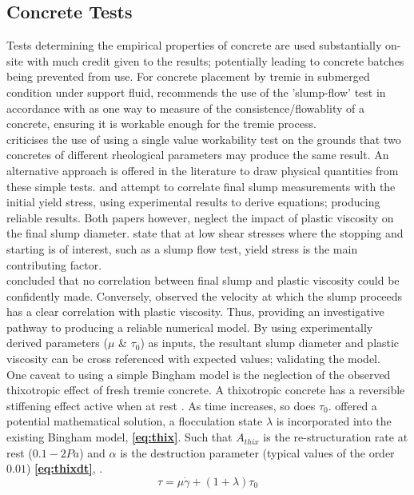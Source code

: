 \subsection{Concrete Tests}
Tests determining the empirical properties of concrete are used substantially on-site with much credit given to the results; potentially leading to concrete batches being prevented from use. For concrete placement by tremie in submerged condition under support fluid, \citet{Sperwall} recommends the use of the 'slump-flow' test in accordance with \citeauthor{BS123508} as one way to measure of the consistence/flowablity of a concrete, ensuring it is workable enough for the tremie process.\\
\newline
\noindent
\citet{wallevik06} criticises the use of using a single value workability test on the grounds that two concretes of different rheological parameters may produce the same result. An alternative approach is offered in the literature to draw physical quantities from these simple tests. \citet{roussel50} and \citet{wallevik06} attempt to correlate final slump measurements with the initial yield stress, using experimental results to derive equations; producing reliable results. Both papers however, neglect the impact of plastic viscosity on the final slump diameter. \citet{sofcf} state that at low shear stresses where the stopping and starting is of interest, such as a slump flow test, yield stress is the main contributing factor.\\
\newline
\noindent
\citet{wallevik06} concluded that no correlation between final slump and plastic viscosity could be confidently made. Conversely, \citet{TUM} observed the velocity at which the slump proceeds has a clear correlation with plastic viscosity. Thus, providing an investigative pathway to producing a reliable numerical model. By using experimentally derived parameters ($\mu$ \& $\tau_0$) as inputs, the resultant slump diameter and plastic viscosity can be cross referenced with expected values; validating the model.\\
\newline
One caveat to using a simple Bingham model is the neglection of the observed thixotropic effect of fresh tremie concrete. A thixotropic concrete has a reversible stiffening effect active when at rest \citep{EFFC}. As time increases, so does $\tau_0$. \citet{roussel06} offered a potential mathematical solution, a flocculation state $\lambda$ is incorporated into the existing Bingham model, {\bfseries \ref{eq:thix}}. Such that $A_{thix}$ is the re-structuration rate at rest ($0.1-2 Pa$) and $\alpha$ is the destruction parameter (typical values of the order $0.01$) {\bfseries \ref{eq:thixdt}}, \citet{roussel07}.
\begin{equation}
\tau = \mu\dot{\gamma}+(1+\lambda)\tau_0
\label{eq:thix}
\end{equation}

